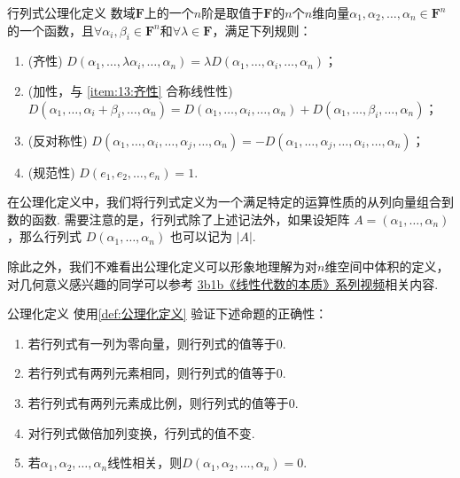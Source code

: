 \begin{definition}{行列式}{公理化定义} 
    数域$\mathbf{F}$上的一个$n$阶是取值于$\mathbf{F}$的$n$个$n$维向量$\alpha_1,\alpha_2,\ldots,\alpha_n \in \mathbf{F}^n$的一个函数，且$\forall \alpha_i,\beta_i \in \mathbf{F}^n$和$\forall \lambda \in \mathbf{F}$，满足下列规则：
    \begin{enumerate}
        \item \label{item:13:齐性}
              (齐性) $D(\alpha_1,\ldots,\lambda\alpha_i,\ldots,\alpha_n)=\lambda D(\alpha_1,\ldots,\alpha_i,\ldots,\alpha_n)$；

        \item \label{item:13:加性}
              (加性，与 \ref*{item:13:齐性} 合称线性性) \\
              $D(\alpha_1,\ldots,\alpha_i+\beta_i,\ldots,\alpha_n)=D(\alpha_1,\ldots,\alpha_i,\ldots,\alpha_n)+D(\alpha_1,\ldots,\beta_i,\ldots,\alpha_n)$；

        \item \label{item:13:反对称性}
              (反对称性) $D(\alpha_1,\ldots,\alpha_i,\ldots,\alpha_j,\ldots,\alpha_n)=-D(\alpha_1,\ldots,\alpha_j,\ldots,\alpha_i,\ldots,\alpha_n)$；

        \item \label{item:13:规范性}
              (规范性) $D(e_1,e_2,\ldots,e_n)=1$.
    \end{enumerate}
\end{definition}
在公理化定义中，我们将行列式定义为一个满足特定的运算性质的从列向量组合到数的函数. 需要注意的是，行列式除了上述记法外，如果设矩阵 $A = (\alpha_1,\ldots,\alpha_n)$，那么行列式 $D(\alpha_1,\ldots,\alpha_n)$ 也可以记为 $|A|$.

除此之外，我们不难看出公理化定义可以形象地理解为对$n$维空间中体积的定义，对几何意义感兴趣的同学可以参考 \href{https://b23.tv/BV1ys411472E}{3b1b《线性代数的本质》系列视频}相关内容.
\begin{example}{}{公理化定义}
    使用\autoref{def:公理化定义} 验证下述命题的正确性：
    \begin{enumerate}
        \item 若行列式有一列为零向量，则行列式的值等于0.

        \item 若行列式有两列元素相同，则行列式的值等于0.

        \item 若行列式有两列元素成比例，则行列式的值等于0.

        \item 对行列式做倍加列变换，行列式的值不变.

        \item 若$\alpha_1,\alpha_2,\ldots,\alpha_n$线性相关，则$D(\alpha_1,\alpha_2,\ldots,\alpha_n)=0$.
    \end{enumerate}
\end{example}


